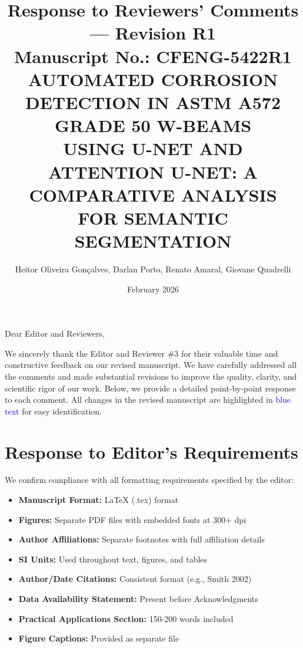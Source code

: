 \documentclass[11pt]{article}
\title{\textbf{Response to Reviewers' Comments --- Revision R1}\\[0.5cm]
\large Manuscript No.: CFENG-5422R1\\[0.3cm]
\normalsize AUTOMATED CORROSION DETECTION IN ASTM A572 GRADE 50 W-BEAMS\\
USING U-NET AND ATTENTION U-NET: A COMPARATIVE ANALYSIS\\
FOR SEMANTIC SEGMENTATION}
\author{Heitor Oliveira Gonçalves, Darlan Porto, Renato Amaral, Giovane Quadrelli}
\date{February 2026}
\begin{document}
\maketitle

\noindent Dear Editor and Reviewers,

\vspace{0.3cm}

\noindent We sincerely thank the Editor and Reviewer \#3 for their valuable time and constructive feedback on our revised manuscript. We have carefully addressed all the comments and made substantial revisions to improve the quality, clarity, and scientific rigor of our work. Below, we provide a detailed point-by-point response to each comment. All changes in the revised manuscript are highlighted in \textcolor{blue}{blue text} for easy identification.

\vspace{0.5cm}

\tableofcontents

\newpage

\section{Response to Editor's Requirements}

We confirm compliance with all formatting requirements specified by the editor:

\begin{itemize}[leftmargin=*]
    \item \textbf{Manuscript Format:} LaTeX (.tex) format
    \item \textbf{Figures:} Separate PDF files with embedded fonts at 300+ dpi
    \item \textbf{Author Affiliations:} Separate footnotes with full affiliation details
    \item \textbf{SI Units:} Used throughout text, figures, and tables
    \item \textbf{Author/Date Citations:} Consistent format (e.g., Smith 2002)
    \item \textbf{Data Availability Statement:} Present before Acknowledgments
    \item \textbf{Practical Applications Section:} 150-200 words included
    \item \textbf{Figure Captions:} Provided as separate file
\end{itemize}
\end{document}
